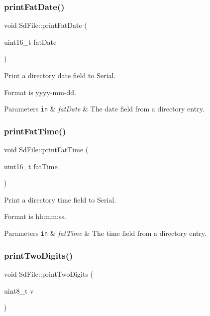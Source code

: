 \subsubsection{\texorpdfstring{print\+Fat\+Date()}{printFatDate()}}
{\footnotesize\ttfamily void Sd\+File\+::print\+Fat\+Date (\begin{DoxyParamCaption}\item[{uint16\+\_\+t}]{fat\+Date }\end{DoxyParamCaption})\hspace{0.3cm}{\ttfamily [static]}}

Print a directory date field to Serial.

Format is yyyy-\/mm-\/dd.


\begin{DoxyParams}[1]{Parameters}
\mbox{\tt in}  & {\em fat\+Date} & The date field from a directory entry. \\
\hline
\end{DoxyParams}
\mbox{\label{class_sd_file_ab981ea789ec76d1a44e4b3c8a84ccd35}} 
\subsubsection{\texorpdfstring{print\+Fat\+Time()}{printFatTime()}}
{\footnotesize\ttfamily void Sd\+File\+::print\+Fat\+Time (\begin{DoxyParamCaption}\item[{uint16\+\_\+t}]{fat\+Time }\end{DoxyParamCaption})\hspace{0.3cm}{\ttfamily [static]}}

Print a directory time field to Serial.

Format is hh\+:mm\+:ss.


\begin{DoxyParams}[1]{Parameters}
\mbox{\tt in}  & {\em fat\+Time} & The time field from a directory entry. \\
\hline
\end{DoxyParams}
\mbox{\label{class_sd_file_a0af47048953a2d1526db9336c39a8919}} 
\subsubsection{\texorpdfstring{print\+Two\+Digits()}{printTwoDigits()}}
{\footnotesize\ttfamily void Sd\+File\+::print\+Two\+Digits (\begin{DoxyParamCaption}\item[{uint8\+\_\+t}]{v }\end{DoxyParamCaption})\hspace{0.3cm}{\ttfamily [static]}}

